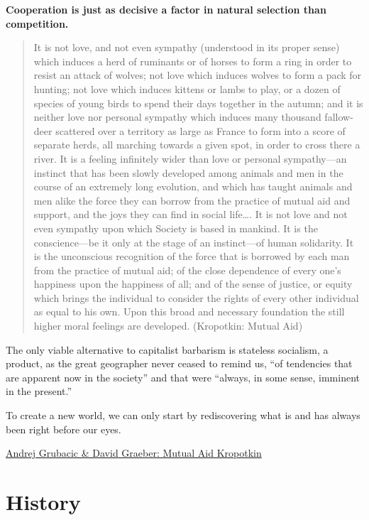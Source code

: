 \documentclass[
]{book}
\begin{document}
\textbf{Cooperation is just as decisive a factor in natural selection than competition.}

\begin{quote}
It is not love, and not even sympathy (understood in its proper sense) which induces a herd of ruminants or of horses to form a ring in order to resist an attack of wolves; not love which induces wolves to form a pack for hunting; not love which induces kittens or lambs to play, or a dozen of species of young birds to spend their days together in the autumn; and it is neither love nor personal sympathy which induces many thousand fallow-deer scattered over a territory as large as France to form into a score of separate herds, all marching towards a given spot, in order to cross there a river. It is a feeling infinitely wider than love or personal sympathy---an instinct that has been slowly developed among animals and men in the course of an extremely long evolution, and which has taught animals and men alike the force they can borrow from the practice of mutual aid and support, and the joys they can find in social life\ldots. It is not love and not even sympathy upon which Society is based in mankind. It is the conscience---be it only at the stage of an instinct---of human solidarity. It is the unconscious recognition of the force that is borrowed by each man from the practice of mutual aid; of the close dependence of every one's happiness upon the happiness of all; and of the sense of justice, or equity which brings the individual to consider the rights of every other individual as equal to his own. Upon this broad and necessary foundation the still higher moral feelings are developed.
(Kropotkin: Mutual Aid)
\end{quote}

The only viable alternative to capitalist barbarism is stateless socialism, a product, as the great geographer never ceased to remind us, ``of tendencies that are apparent now in the society'' and that were ``always, in some sense, imminent in the present.''

To create a new world, we can only start by rediscovering what is and has always been right before our eyes.

\href{https://theanarchistlibrary.org/library/andrej-grubacic-david-graeber-introduction-to-mutual-aid}{Andrej Grubacic \& David Graeber: Mutual Aid Kropotkin}

\hypertarget{history}{%
\chapter{History}\label{history}}
\end{document}
